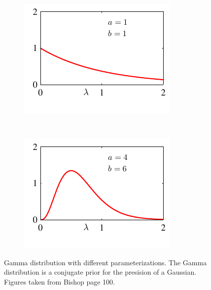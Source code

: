 \begin{itemize}
\begin{figure}
\centering
\begin{subfigure}[b]{0.45\textwidth}
                \centering
                \includegraphics[width=\textwidth]{./lecture4/Figure213b.pdf}
    \end{subfigure}%
	~
	\begin{subfigure}[b]{0.45\textwidth}
                \centering
                \includegraphics[width=\textwidth]{./lecture4/Figure213c.pdf}
    \end{subfigure}%
   	\caption{Gamma distribution with different parameterizations. The Gamma distribution is a conjugate prior for the presision of a Gaussian. Figures taken from Bishop page 100.}
	
\end{figure}
\end{itemize}


